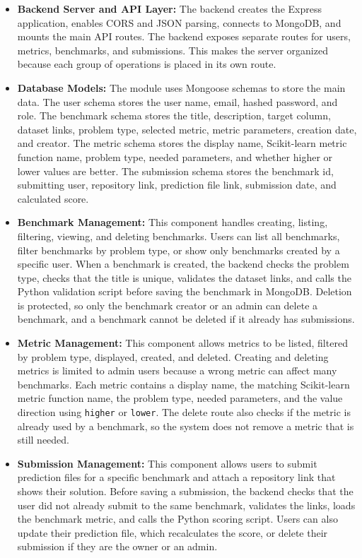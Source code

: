 \documentclass[12pt,a4paper]{report}
\begin{document}
\begin{itemize}
  \item \textbf{Backend Server and API Layer:}
  The backend creates the Express application, enables CORS and JSON parsing,
  connects to MongoDB, and mounts the main API routes. The backend exposes
  separate routes for users, metrics, benchmarks, and submissions. This makes
  the server organized because each group of operations is placed in its own
  route.

  \item \textbf{Database Models:}
  The module uses Mongoose schemas to store the main data. The user schema
  stores the user name, email, hashed password, and role. The benchmark schema
  stores the title, description, target column, dataset links, problem type,
  selected metric, metric parameters, creation date, and creator. The metric
  schema stores the display name, Scikit-learn metric function name, problem
  type, needed parameters, and whether higher or lower values are better. The
  submission schema stores the benchmark id, submitting user, repository link,
  prediction file link, submission date, and calculated score.

  \item \textbf{Benchmark Management:}
  This component handles creating, listing, filtering, viewing, and deleting
  benchmarks. Users can list all benchmarks, filter benchmarks by problem type,
  or show only benchmarks created by a specific user. When a benchmark is
  created, the backend checks the problem type, checks that the title is unique,
  validates the dataset links, and calls the Python validation script before
  saving the benchmark in MongoDB. Deletion is protected, so only the benchmark
  creator or an admin can delete a benchmark, and a benchmark cannot be deleted
  if it already has submissions.

  \item \textbf{Metric Management:}
  This component allows metrics to be listed, filtered by problem type,
  displayed, created, and deleted. Creating and deleting metrics is limited to
  admin users because a wrong metric can affect many benchmarks. Each metric
  contains a display name, the matching Scikit-learn metric function name, the
  problem type, needed parameters, and the value direction using
  \texttt{higher} or \texttt{lower}. The delete route also checks if the metric
  is already used by a benchmark, so the system does not remove a metric that is
  still needed.

  \item \textbf{Submission Management:}
  This component allows users to submit prediction files for a specific
  benchmark and attach a repository link that shows their solution. Before
  saving a submission, the backend checks that the user did not already submit
  to the same benchmark, validates the links, loads the benchmark metric, and
  calls the Python scoring script. Users can also update their prediction file,
  which recalculates the score, or delete their submission if they are the owner
  or an admin.


\end{itemize}
\end{document}

